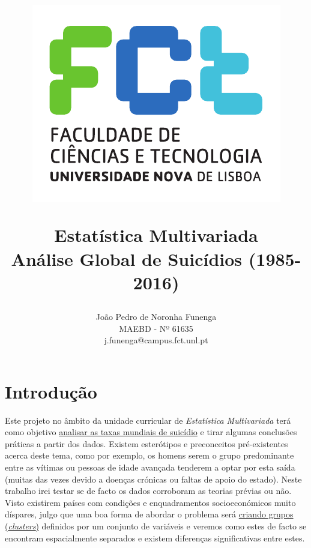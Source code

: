 \documentclass[a4paper,12pt]{article}
\begin{document}
\title{
	\begin{center}
		\includegraphics[scale=0.5]{logofct.pdf}
	\end{center}
	Estatística Multivariada \\ \small{Análise Global de Suicídios (1985-2016)}}
\author{João Pedro de Noronha Funenga \\ MAEBD - Nº 61635 \\ j.funenga@campus.fct.unl.pt}


\maketitle
\newpage

\tableofcontents
\newpage

\listoffigures
\listoftables
\newpage


\section{Introdução}
Este projeto no âmbito da unidade curricular de \textit{Estatística Multivariada} terá como objetivo \underline{analisar as taxas mundiais de suicídio} e tirar algumas conclusões práticas a partir dos dados. Existem esterótipos e preconceitos pré-existentes acerca deste tema, como por exemplo, os homens serem o grupo predominante entre as vítimas ou pessoas de idade avançada tenderem a optar por esta saída (muitas das vezes devido a doenças crónicas ou faltas de apoio do estado). Neste trabalho irei testar se de facto os dados corroboram as teorias prévias ou não. Visto existirem países com condições e enquadramentos socioeconómicos muito díspares, julgo que uma boa forma de abordar o problema será \underline{criando grupos (\textit{clusters})} definidos por um conjunto de variáveis e veremos como estes de facto se encontram espacialmente separados e existem diferenças significativas entre estes.
\end{document}
